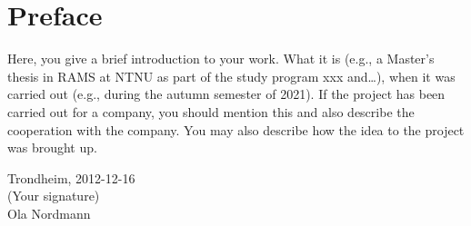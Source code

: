 \section*{Preface}
Here, you give a brief introduction to your work. What it is (e.g., a Master's thesis in RAMS at NTNU as part of the study program xxx and\ldots), when it was carried out (e.g., during the autumn semester of 2021). If the project has been carried out for a company, you should mention this and also describe the cooperation with the company. You may also describe how the idea to the project was brought up.\\[2cm]

\begin{center}
Trondheim, 2012-12-16\\[1pc]
(Your signature)\\[1pc]
Ola Nordmann
\end{center}